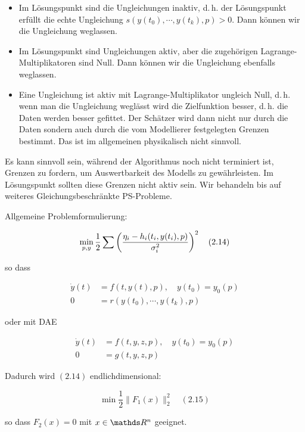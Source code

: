 \begin{itemize}
\item Im Lösungspunkt sind die Ungleichungen inaktiv, d.\,h. der Lösungspunkt erfüllt die echte Ungleichung $s(y(t_0), \cdots, y(t_k), p) > 0$. Dann können wir die Ungleichung weglassen.
\item Im Lösungspunkt sind Ungleichungen aktiv, aber die zugehörigen Lagrange-Multiplikatoren sind Null. Dann können wir die Ungleichung ebenfalls weglassen.
\item Eine Ungleichung ist aktiv mit Lagrange-Multiplikator ungleich Null, d.\,h. wenn man die Ungleichung weglässt wird die Zielfunktion besser, d.\,h. die Daten werden besser gefittet. Der Schätzer wird dann nicht nur durch die Daten sondern auch durch die vom Modellierer festgelegten Grenzen bestimmt. Das ist im allgemeinen physikalisch nicht sinnvoll.
\end{itemize}

Es kann sinnvoll sein, während der Algorithmus noch nicht terminiert ist, Grenzen zu fordern, um Auswertbarkeit des Modells zu gewährleisten. Im Lösungspunkt sollten diese Grenzen nicht aktiv sein. Wir behandeln bis auf weiteres Gleichungsbeschränkte PS-Probleme.

Allgemeine Problemformulierung:

\[ \min_{p,y} \frac 12 \sum \left( \frac{\eta_i - h_i(t_i,y(t_i),p)}{\sigma_i^2} \right)^2 \quad (2.14)\]

so dass

\begin{align*}
\dot y(t) &= f(t,y(t),p), \quad y(t_0) = y_0(p) \\
0 &= r(y(t_0), \cdots, y(t_k), p)
\end{align*}

oder mit DAE

\begin{align*}
\dot y(t) &= f(t,y,z,p), \quad y(t_0) = y_0(p) \\
0 &= g(t,y,z,p) 
\end{align*}



Dadurch wird $(2.14)$ endlichdimensional:

\[ \min \frac 12 \|F_1(x)\|_2^2 \quad (2.15)\]

so dass $F_2(x) = 0$ mit $x \in \R^n$ geeignet.

